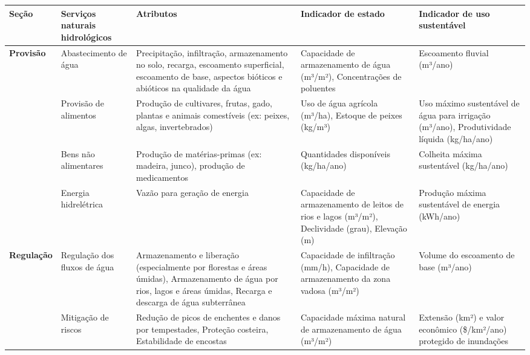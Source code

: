 \documentclass[./main.tex]{subfiles}
\begin{document}
{\renewcommand{\arraystretch}{1.5}
\begin{table}[t!]
    \centering	
    \tiny
    \sffamily
    \begin{tabular}{ 
        >{\raggedright\arraybackslash}m{1.5cm} 
        >{\raggedright\arraybackslash}m{2.5cm}  
        >{\raggedright\arraybackslash}m{3.0cm}  
        >{\raggedright\arraybackslash}m{2.5cm}
        >{\raggedright\arraybackslash}m{2.5cm}
    }
    \toprule 
    \textbf{Seção} & \textbf{Serviços naturais hidrológicos} & \textbf{Atributos} & \textbf{Indicador de estado} & \textbf{Indicador de uso sustentável} \\ 
    \midrule 
    \textbf{Provisão} & Abastecimento de água & Precipitação, infiltração, armazenamento no solo, recarga, escoamento superficial, escoamento de base, aspectos bióticos e abióticos na qualidade da água & Capacidade de armazenamento de água (m³/m²), Concentrações de poluentes & Escoamento fluvial (m³/ano) \\ 
    
    \cline{2-5} 
     & Provisão de alimentos & Produção de cultivares, frutas, gado, plantas e animais comestíveis (ex: peixes, algas, invertebrados) & Uso de água agrícola (m³/ha), Estoque de peixes (kg/m³) & Uso máximo sustentável de água para irrigação (m³/ano), Produtividade líquida (kg/ha/ano) \\ 
    
    \cline{2-5}
     & Bens não alimentares & Produção de matérias-primas (ex: madeira, junco), produção de medicamentos & Quantidades disponíveis (kg/ha/ano) & Colheita máxima sustentável (kg/ha/ano) \\ 
    
    \cline{2-5} & Energia hidrelétrica & Vazão para geração de energia & Capacidade de armazenamento de leitos de rios e lagos (m³/m²), Declividade (grau), Elevação (m) & Produção máxima sustentável de energia (kWh/ano) \\ 
    
    \textbf{Regulação} & Regulação dos fluxos de água & Armazenamento e liberação (especialmente por florestas e áreas úmidas), Armazenamento de água por rios, lagos e áreas úmidas, Recarga e descarga de água subterrânea & Capacidade de infiltração (mm/h), Capacidade de armazenamento da zona vadosa (m³/m²) & Volume do escoamento de base (m³/ano) \\ 
    
    \cline{2-5}
    & Mitigação de riscos & Redução de picos de enchentes e danos por tempestades, Proteção costeira, Estabilidade de encostas & Capacidade máxima natural de armazenamento de água (m³/m²) & Extensão (km²) e valor econômico (\$/km²/ano) protegido de inundações \\ 
    

\end{tabular}
\end{table}}
\end{document}
